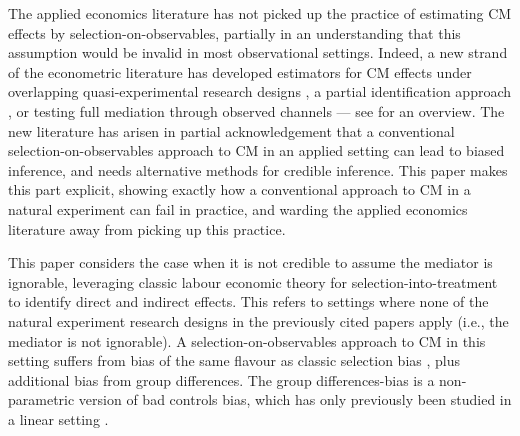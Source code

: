 The applied economics literature has not picked up the practice of estimating CM effects by selection-on-observables, partially in an understanding that this assumption would be invalid in most observational settings.
Indeed, a new strand of the econometric literature has developed estimators for CM effects under overlapping quasi-experimental research designs \citep{deuchert2019direct,frolich2017direct}, a partial identification approach \citep{flores2009identification,blackwell2024assumption}, or testing full mediation through observed channels \citep{kwon2024testing} --- see \cite{huber2019review} for an overview.
The new literature has arisen in partial acknowledgement that a conventional selection-on-observables approach to CM in an applied setting can lead to biased inference, and needs alternative methods for credible inference.
This paper makes this part explicit, showing exactly how a conventional approach to CM in a natural experiment can fail in practice, and warding the applied economics literature away from picking up this practice.

This paper considers the case when it is not credible to assume the mediator is ignorable, leveraging classic labour economic theory for selection-into-treatment to identify direct and indirect effects.
This refers to settings where none of the natural experiment research designs in the previously cited papers apply (i.e., the mediator is not ignorable).
A selection-on-observables approach to CM in this setting suffers from bias of the same flavour as classic selection bias \citep{heckman1998characterizing}, plus additional bias from group differences.
The group differences-bias is a non-parametric version of bad controls bias, which has only previously been studied in a linear setting \citep{cinelli2024crash,ding2015adjust}.

